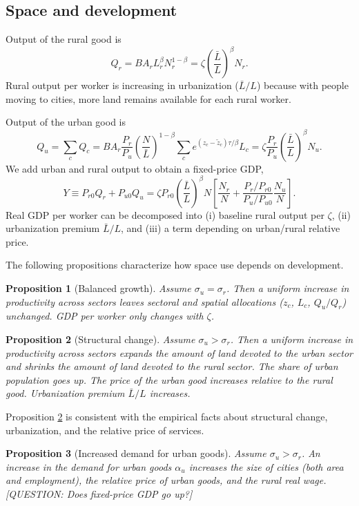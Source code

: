 \documentclass[12pt]{article}
\newtheorem{proposition}{Proposition}
\begin{document}
\subsection{Space and development}
Output of the rural good is
\[
Q_r = B A_r L_r^{\beta}N_r^{1-\beta}=
\zeta \left(\frac{\bar L}{L}\right)^\beta
{N_r}.
\]
Rural output per worker is increasing in urbanization ($\bar L/L$) because with people moving to cities, more land remains available for each rural worker.

Output of the urban good is
\[
Q_u = \sum_c Q_c
= B A_r \frac{P_r}{P_u}
\left(\frac {N}
	{{\bar L}}
\right)^{1-\beta}
\sum_c e^{(z_c-\tilde z_c)\tau/\beta} L_c=
\zeta\frac{P_r}{P_u}
\left(\frac{\bar L}{L}\right)^\beta
N_u.
\]
We add urban and rural output to obtain a fixed-price GDP,
\begin{equation}
	Y \equiv
	P_{r0}Q_r + P_{u0}Q_u
	=
	\zeta P_{r0} \left(\frac{\bar L}{L}\right)^\beta N
\left[
\frac {N_r}{N}
+
\frac{P_r/P_{r0}}{P_u/P_{u0}}
\frac {N_u}{N}
\right].
\end{equation}
Real GDP per worker can be decomposed into (i) baseline rural output per $\zeta$, (ii) urbanization premium $\bar L/L$, and (iii) a term depending on urban/rural relative price.


The following propositions characterize how space use depends on development.
\begin{proposition}[Balanced growth]\label{prop:balanced_growth}
Assume $\sigma_u=\sigma_r$. Then a uniform increase in productivity across sectors leaves sectoral and spatial allocations ($z_c$, $L_c$, $Q_u/Q_r$) unchanged. GDP per worker only changes with $\zeta$.
\end{proposition}

\begin{proposition}[Structural change]\label{prop:comparative_static}
Assume $\sigma_u>\sigma_r$. Then a uniform increase in productivity across sectors expands the amount of land devoted to the urban sector and shrinks the amount of land devoted to the rural sector. The share of urban population goes up. The price of the urban good increases relative to the rural good. Urbanization premium $\bar L/L$ increases.
\end{proposition}

Proposition \ref{prop:comparative_static} is consistent with the empirical facts about structural change, urbanization, and the relative price of services.

\begin{proposition}[Increased demand for urban goods]\label{prop:demand}
Assume $\sigma_u>\sigma_r$. An increase in the demand for urban goods $\alpha_u$ increases the size of cities (both area and employment), the relative price of urban goods, and the rural real wage. [QUESTION: Does fixed-price GDP go up?]
\end{proposition}
\end{document}
